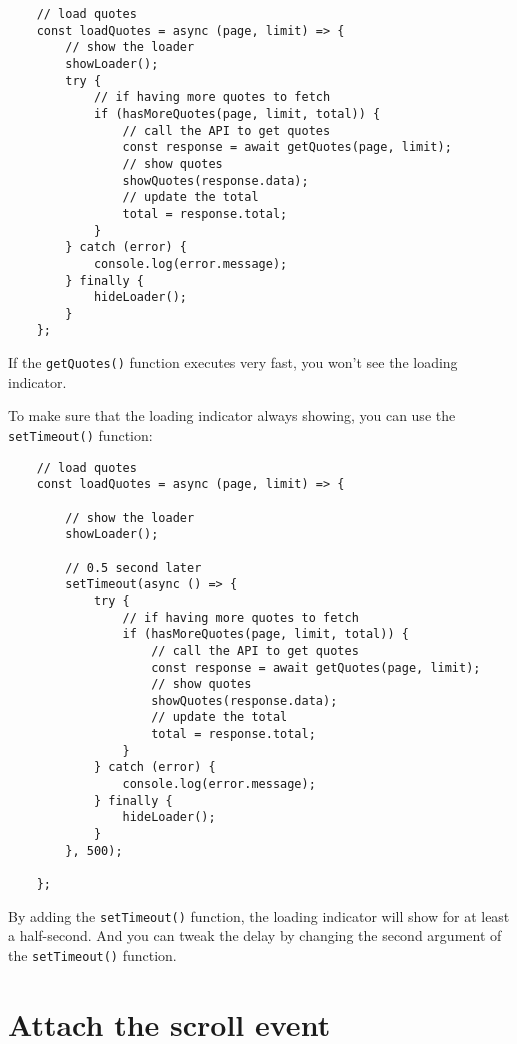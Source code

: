 \documentclass[11pt]{article}
\begin{document}
\begin{lstlisting}
    // load quotes
    const loadQuotes = async (page, limit) => {
        // show the loader
        showLoader();
        try {
            // if having more quotes to fetch
            if (hasMoreQuotes(page, limit, total)) {
                // call the API to get quotes
                const response = await getQuotes(page, limit);
                // show quotes
                showQuotes(response.data);
                // update the total
                total = response.total;
            }
        } catch (error) {
            console.log(error.message);
        } finally {
            hideLoader();
        }
    };
\end{lstlisting}

If the \verb|getQuotes()| function executes very fast,
you won't see the loading indicator.
\newline

\noindent
To make sure that the loading indicator always showing,
you can use the \verb|setTimeout()| function:

\begin{lstlisting}
    // load quotes
    const loadQuotes = async (page, limit) => {

        // show the loader
        showLoader();

        // 0.5 second later
        setTimeout(async () => {
            try {
                // if having more quotes to fetch
                if (hasMoreQuotes(page, limit, total)) {
                    // call the API to get quotes
                    const response = await getQuotes(page, limit);
                    // show quotes
                    showQuotes(response.data);
                    // update the total
                    total = response.total;
                }
            } catch (error) {
                console.log(error.message);
            } finally {
                hideLoader();
            }
        }, 500);

    };
\end{lstlisting}

\noindent
By adding the \verb|setTimeout()| function, the loading indicator will
show for at least a half-second. And you can tweak the delay by
changing the second argument of the \verb|setTimeout()| function.

\section*{Attach the scroll event}
\end{document}
